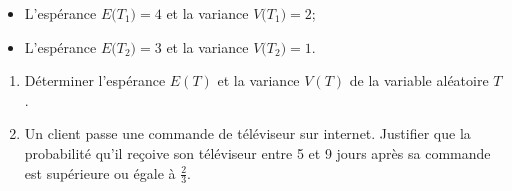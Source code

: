 \begin{enumerate}
	\begin{itemize}
		\item L'espérance $E\big(T_{1}\big)=4$ et la variance $V\big(T_{1}\big)=2$;
		\item L'espérance $E\big(T_{2}\big)=3$ et la variance $V\big(T_{2}\big)=1$.
	\end{itemize}
	\begin{enumerate}
		\item Déterminer l'espérance $E(T)$ et la variance $V(T)$ de la variable aléatoire $T$.
		\item Un client passe une commande de téléviseur sur internet. Justifier que la probabilité qu'il reçoive son téléviseur entre 5 et 9 jours après sa commande est supérieure ou égale à $\frac{2}{3}$.
	\end{enumerate}
\end{enumerate}